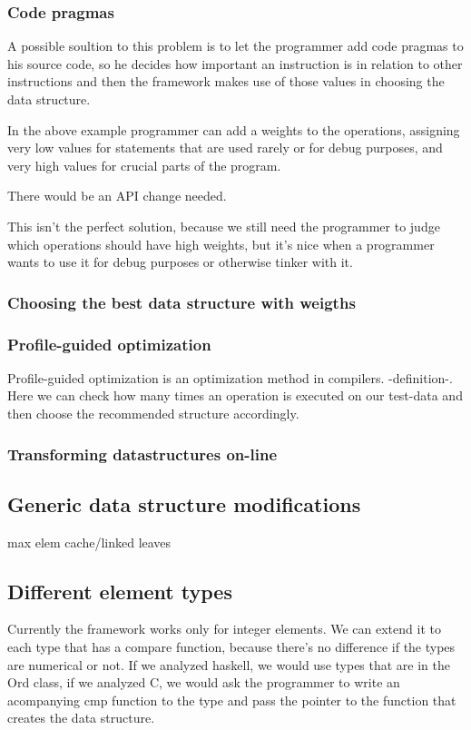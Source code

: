 \documentclass[11pt]{article}
\begin{document}
		\subsubsection{Code pragmas}
			A possible soultion to this problem is to let the programmer add code pragmas to his source code,
			so he decides how important an instruction is in relation to other instructions and then the framework
			makes use of those values in choosing the data structure.
			
			In the above example programmer can add a weights to the operations,
			assigning very low values for statements that are used rarely or for debug purposes,
			and very high values for crucial parts of the program.

			There would be an API change needed.
			
			This isn't the perfect solution, because we still need the programmer to judge
			which operations should have high weights, but it's nice when a programmer
			wants to use it for debug purposes or otherwise tinker with it.

		\subsubsection{Choosing the best data structure with weigths}

		\subsubsection{Profile-guided optimization}
			Profile-guided optimization is an optimization method in compilers. -definition-.
			Here we can check how many times an operation is executed on our test-data
			and then choose the recommended structure accordingly.
		\subsubsection{Transforming datastructures on-line}
	\subsection{Generic data structure modifications}

		max elem cache/linked leaves
	\subsection{Different element types}
		Currently the framework works only for integer elements. We can extend it to each type that has a compare function,
		because there's no difference if the types are numerical or not.
		If we analyzed haskell, we would use types that are in the Ord class,
		if we analyzed C, we would ask the programmer to write an acompanying cmp function to the type and pass the pointer to the function that creates the data structure.
\end{document}
